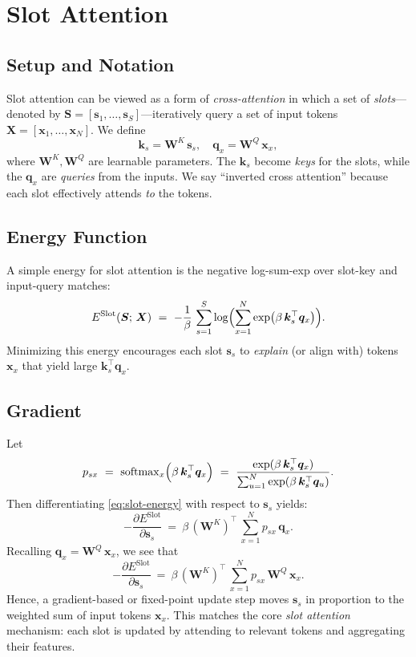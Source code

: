 \documentclass{article}
\begin{document}
\section{Slot Attention}

\subsection{Setup and Notation}

Slot attention can be viewed as a form of \emph{cross-attention} in which a set of \emph{slots}---denoted by \(\bm{S} = [\bm{s}_1, \ldots, \bm{s}_S]\)---iteratively query a set of input tokens \(\bm{X} = [\bm{x}_1, \ldots, \bm{x}_N]\).  We define
\[
\bm{k}_s = \bm{W}^K \,\bm{s}_s,
\quad
\bm{q}_x = \bm{W}^Q \,\bm{x}_x,
\]
where \(\bm{W}^K, \bm{W}^Q\) are learnable parameters.  The \(\bm{k}_s\) become \emph{keys} for the slots, while the \(\bm{q}_x\) are \emph{queries} from the inputs.  We say ``inverted cross attention'' because each slot effectively attends \emph{to} the tokens.

\subsection{Energy Function}

A simple energy for slot attention is the negative log-sum-exp over slot-key and input-query matches:
\begin{equation}
E^{\text{Slot}}(\bm{S};\,\bm{X})
~=~
-\frac{1}{\beta}\,\sum_{s=1}^S
\log \Bigl(\sum_{x=1}^N \exp \bigl(\beta\,\bm{k}_s^\top \bm{q}_x\bigr)\Bigr).
\label{eq:slot-energy}
\end{equation}
Minimizing this energy encourages each slot \(\bm{s}_s\) to \emph{explain} (or align with) tokens \(\bm{x}_x\) that yield large \(\bm{k}_s^\top \bm{q}_x\).

\subsection{Gradient}

Let
\[
p_{sx}
~=~
\mathrm{softmax}_x
 \Bigl(\beta \,\bm{k}_s^\top \bm{q}_x\Bigr)
~=~
\frac{\exp(\beta\,\bm{k}_s^\top \bm{q}_x)}{\sum_{u=1}^N \exp(\beta\,\bm{k}_s^\top \bm{q}_u)}.
\]
Then differentiating \eqref{eq:slot-energy} with respect to \(\bm{s}_s\) yields:
\[
-\frac{\partial E^{\text{Slot}}}{\partial \bm{s}_s}
~=~
\beta \,(\bm{W}^K)^\top \,\sum_{x=1}^N 
p_{sx}\,\bm{q}_x.
\]
Recalling \(\bm{q}_x = \bm{W}^Q\,\bm{x}_x\), we see that
\[
-\frac{\partial E^{\text{Slot}}}{\partial \bm{s}_s}
~=~
\beta \,(\bm{W}^K)^\top \,\sum_{x=1}^N p_{sx}\,\bm{W}^Q\,\bm{x}_x.
\]
Hence, a gradient-based or fixed-point update step moves \(\bm{s}_s\) in proportion to the weighted sum of input tokens \(\bm{x}_x\).  This matches the core \emph{slot attention} mechanism: each slot is updated by attending to relevant tokens and aggregating their features.
\end{document}
